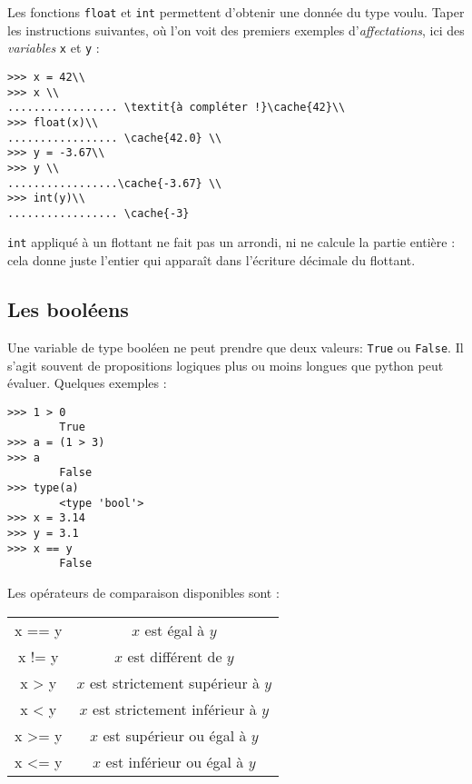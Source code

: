 \begin{multicols}{2}
Les fonctions \texttt{float} et \texttt{int} permettent d'obtenir une donnée du type voulu. Taper les instructions suivantes, où l'on voit des premiers exemples d'\emph{affectations}, ici des \emph{variables} \texttt{x} et \texttt{y} : 
\begin{lstlisting}
>>> x = 42\\
>>> x \\
................. \textit{à compléter !}\cache{42}\\
>>> float(x)\\
................. \cache{42.0} \\
>>> y = -3.67\\
>>> y \\
.................\cache{-3.67} \\
>>> int(y)\\
................. \cache{-3}
\end{lstlisting}

\begin{warn}
 \texttt{int} appliqué à un flottant ne fait pas un arrondi, ni ne calcule la partie entière : cela donne juste l'entier qui apparaît dans l'écriture décimale du flottant.\
 \end{warn}




\subsection*{Les booléens}

Une variable de type booléen ne peut prendre que deux valeurs: \texttt{True} ou \texttt{False}. Il s'agit souvent de propositions logiques plus ou moins longues que python peut évaluer. 
 Quelques exemples : 
\begin{lstlisting} 
>>> 1 > 0
        True
>>> a = (1 > 3)
>>> a
        False 
>>> type(a)
        <type 'bool'>
>>> x = 3.14
>>> y = 3.1
>>> x == y 
        False
\end{lstlisting}

Les opérateurs de comparaison disponibles sont :

\begin{center}
\begin{tabular}{>{\ttfamily}cc}
\hline
x == y&$x$ est égal à $y$\\
x != y & $x$ est différent de $y$\\
x > y & $x$ est strictement supérieur à $y$\\
x < y & $x$ est strictement inférieur à $y$\\
x >= y& $x$ est supérieur ou égal à $y$\\
x <= y& $x$ est inférieur ou égal à $y$\\
\hline
\end{tabular}
\end{center}


\end{multicols}
